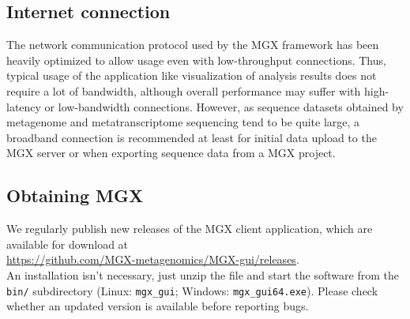 \subsection{Internet connection}

The network communication protocol used by the MGX framework has been heavily optimized to
allow usage even with low-throughput connections. Thus, typical usage of the application
like visualization of analysis results does not require a lot of bandwidth, although
overall performance may suffer with high-latency or low-bandwidth connections. However, as
sequence datasets obtained by metagenome and metatranscriptome sequencing tend to be quite large, a broadband 
connection is recommended at least for initial data upload to the MGX server or when exporting
sequence data from a MGX project.

\subsection{Obtaining MGX}

We regularly publish new releases of the MGX client application, which are
available for download at\\

    \url{https://github.com/MGX-metagenomics/MGX-gui/releases}.\\

\noindent
An installation isn't necessary, just unzip the file and start the software
from the \texttt{bin/} subdirectory (Linux: \texttt{mgx\_gui}; Windows: \texttt{mgx\_gui64.exe}). Please check whether an updated version
is available before reporting bugs.

